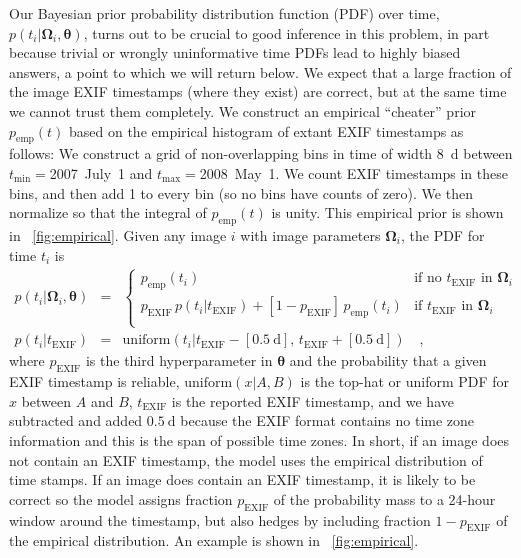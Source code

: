 \documentclass[12pt,preprint]{aastex}
\newcommand{\figref}[1]{\figurename~\ref{#1}}
\newcommand{\paramvector}[1]{\boldsymbol{#1}}
\newcommand{\fovpars}{\paramvector{\Omega}}
\newcommand{\hyperpars}{\paramvector{\theta}}
\newcommand{\uniform}{\mathrm{uniform}}
\newcommand{\tmin}{t_\mathrm{min}}
\newcommand{\tmax}{t_\mathrm{max}}
\newcommand{\pempirical}{p_\mathrm{emp}}
\newcommand{\exif}{\mathrm{EXIF}}
\newcommand{\pexif}{p_\exif}
\newcommand{\texif}{t_\exif}
\newcommand{\unit}[1]{\mathrm{#1}}
\renewcommand{\day}{\unit{d}}
\begin{document}
Our Bayesian prior probability distribution function (PDF) over time,
$p(t_i|\fovpars_i,\hyperpars)$, turns out to be crucial to good
inference in this problem, in part because trivial or wrongly
uninformative time PDFs lead to highly biased answers, a point to
which we will return below.  We expect that a large fraction of the
image EXIF timestamps (where they exist) are correct, but at the same
time we cannot trust them completely.  We construct an empirical
``cheater'' prior $\pempirical(t)$ based on the empirical histogram of
extant EXIF timestamps as follows: We construct a grid of
non-overlapping bins in time of width 8~d between $\tmin=$2007~July~1
and $\tmax=$2008~May~1.  We count EXIF timestamps in these bins, and
then add 1 to every bin (so no bins have counts of zero).  We then
normalize so that the integral of $\pempirical(t)$ is unity.  This
empirical prior is shown in \figref{fig:empirical}.  Given any image
$i$ with image parameters $\fovpars_i$, the PDF for time $t_i$ is
\begin{eqnarray}\displaystyle
p(t_i|\fovpars_i,\hyperpars)
  &=& \left\{\begin{array}{ll}
      \pempirical(t_i)
        & \mbox{if no $\texif$ in $\fovpars_i$} \\
      \pexif\,p(t_i|\texif) + [1-\pexif]\,\pempirical(t_i)
        & \mbox{if $\texif$ in $\fovpars_i$} \\
    \end{array}\right.
\nonumber\\
p(t_i|\texif)
  &=&\uniform(t_i|\texif-[0.5~\day],\,\texif+[0.5~\day])
\quad ,
\end{eqnarray}
where $\pexif$ is the third hyperparameter in $\hyperpars$ and the
probability that a given EXIF timestamp is reliable, $\uniform(x|A,B)$
is the top-hat or uniform PDF for $x$ between $A$ and $B$, $\texif$ is
the reported EXIF timestamp, and we have subtracted and added
$0.5~\day$ because the EXIF format contains no time zone information
and this is the span of possible time zones.  In short, if an image
does not contain an EXIF timestamp, the model uses the empirical
distribution of time stamps.  If an image does contain an EXIF
timestamp, it is likely to be correct so the model assigns fraction
$\pexif$ of the probability mass to a 24-hour window around the
timestamp, but also hedges by including fraction $1-\pexif$ of the
empirical distribution.  An example is shown in
\figref{fig:empirical}.
\end{document}
